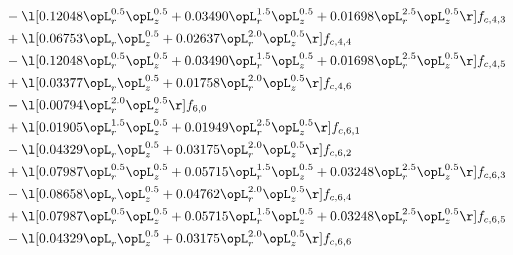 \begin{alignat}{2}
& - \l[  0.12048 \opL_r^{0.5} \opL_z^{0.5} +  0.03490 \opL_r^{1.5} \opL_z^{0.5} +  0.01698 \opL_r^{2.5} \opL_z^{0.5}  \r] f_{c,4,3} \nonumber \\ 
& + \l[  0.06753 \opL_r \opL_z^{0.5} +  0.02637 \opL_r^{2.0} \opL_z^{0.5}  \r] f_{c,4,4} \nonumber \\ 
& - \l[  0.12048 \opL_r^{0.5} \opL_z^{0.5} +  0.03490 \opL_r^{1.5} \opL_z^{0.5} +  0.01698 \opL_r^{2.5} \opL_z^{0.5}  \r] f_{c,4,5} \nonumber \\ 
& + \l[  0.03377 \opL_r \opL_z^{0.5} +  0.01758 \opL_r^{2.0} \opL_z^{0.5}  \r] f_{c,4,6} \nonumber \\ 
& - \l[  0.00794 \opL_r^{2.0} \opL_z^{0.5}  \r] f_{6,0} \nonumber \\ 
& + \l[  0.01905 \opL_r^{1.5} \opL_z^{0.5} +  0.01949 \opL_r^{2.5} \opL_z^{0.5}  \r] f_{c,6,1} \nonumber \\ 
& - \l[  0.04329 \opL_r \opL_z^{0.5} +  0.03175 \opL_r^{2.0} \opL_z^{0.5}  \r] f_{c,6,2} \nonumber \\ 
& + \l[  0.07987 \opL_r^{0.5} \opL_z^{0.5} +  0.05715 \opL_r^{1.5} \opL_z^{0.5} +  0.03248 \opL_r^{2.5} \opL_z^{0.5}  \r] f_{c,6,3} \nonumber \\ 
& - \l[  0.08658 \opL_r \opL_z^{0.5} +  0.04762 \opL_r^{2.0} \opL_z^{0.5}  \r] f_{c,6,4} \nonumber \\ 
& + \l[  0.07987 \opL_r^{0.5} \opL_z^{0.5} +  0.05715 \opL_r^{1.5} \opL_z^{0.5} +  0.03248 \opL_r^{2.5} \opL_z^{0.5}  \r] f_{c,6,5} \nonumber \\ 
& - \l[  0.04329 \opL_r \opL_z^{0.5} +  0.03175 \opL_r^{2.0} \opL_z^{0.5}  \r] f_{c,6,6} \nonumber \\ 
\end{alignat} 


